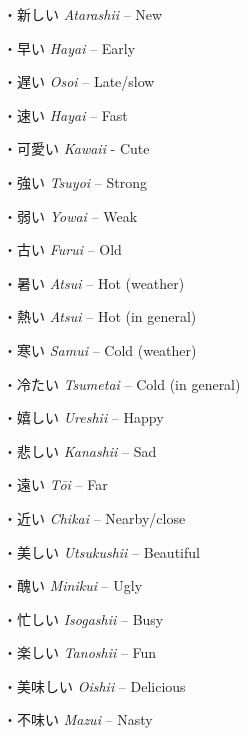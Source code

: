 \par{・新しい \emph{Atarashii }– New }
 
\par{・早い \emph{Hayai }– Early }
 
\par{・遅い \emph{Osoi }– Late\slash slow }
 
\par{・速い \emph{Hayai }– Fast }
 
\par{・可愛い \emph{Kawaii }- Cute }
 
\par{・強い \emph{Tsuyoi }– Strong }
 
\par{・弱い \emph{Yowai }– Weak }
 
\par{・古い \emph{Furui }– Old }
 
\par{・暑い \emph{Atsui }– Hot (weather) }
 
\par{・熱い \emph{Atsui }– Hot (in general) }
 
\par{・寒い \emph{Samui }– Cold (weather) }
 
\par{・冷たい \emph{Tsumetai }– Cold (in general) }
 
\par{・嬉しい \emph{Ureshii }– Happy }
 
\par{・悲しい \emph{Kanashii }– Sad }
 
\par{・遠い \emph{Tōi }– Far }
 
\par{・近い \emph{Chikai }– Nearby\slash close }
 
\par{・美しい \emph{Utsukushii }– Beautiful }
 
\par{・醜い \emph{Minikui }– Ugly }
 
\par{・忙しい \emph{Isogashii }– Busy }
 
\par{・楽しい \emph{Tanoshii }– Fun }
 
\par{・美味しい \emph{Oishii }– Delicious }
 
\par{・不味い \emph{Mazui }– Nasty }
 
